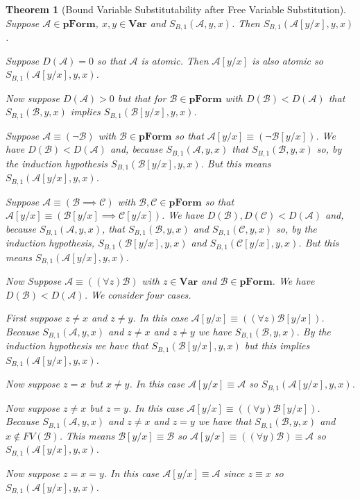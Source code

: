 \documentclass[12pt]{article}
\theoremstyle{break}
\theoremstyle{break}
\newtheorem{theorem}{Theorem}[section]
\theoremstyle{break}
\theoremstyle{break}
\theoremstyle{break}
\newtheorem{informal definition}[definition]{Informal Definition}
\newcommand{\mc}[1]{\mathcal{#1}}
\begin{document}
\begin{theorem}[Bound Variable Substitutability after Free Variable Substitution]
\label{thm:qvsubstitutabilityafterfvsub}
Suppose $\mc{A}\in\textbf{pForm}$, $x, y\in \textbf{Var}$ and $S_{B,1}(\mc{A}, y, x)$. Then $S_{B,1}(\mc{A}[y/x], y, x)$.

Suppose $D(\mc{A}) = 0$ so that $\mc{A}$ is atomic.
Then $\mc{A}[y/x]$ is also atomic so $S_{B,1}(\mc{A}[y/x], y, x)$.

Now suppose $D(\mc{A})>0$ but that for $\mc{B}\in\textbf{pForm}$ with $D(\mc{B}) < D(\mc{A})$ that $S_{B,1}(\mc{B}, y, x)$ implies $S_{B,1}(\mc{B}[y/x],y,x)$.

Suppose $\mc{A} \equiv (\lnot \mc{B})$ with $\mc{B}\in\textbf{pForm}$ so that $\mc{A}[y/x] \equiv (\lnot \mc{B}[y/x])$.
We have $D(\mc{B})<D(\mc{A})$ and, because $S_{B,1}(\mc{A}, y, x)$ that $S_{B,1}(\mc{B}, y, x)$ so, by the induction hypothesis $S_{B,1}(\mc{B}[y/x], y, x)$.
But this means $S_{B,1}(\mc{A}[y/x], y, x)$.

Suppose $\mc{A} \equiv (\mc{B}\implies\mc{C})$ with $\mc{B}, \mc{C}\in\textbf{pForm}$ so that $\mc{A}[y/x] \equiv (\mc{B}[y/x] \implies \mc{C}[y/x])$.
We have $D(\mc{B}), D(\mc{C}) < D(\mc{A})$ and, because $S_{B,1}(\mc{A}, y, x)$, that $S_{B,1}(\mc{B}, y, x)$ and $S_{B,1}(\mc{C}, y, x)$ so, by the induction hypothesis, $S_{B,1}(\mc{B}[y/x], y, x)$ and $S_{B,1}(\mc{C}[y/x], y, x)$.
But this means $S_{B,1}(\mc{A}[y/x], y, x)$.

Now Suppose $\mc{A} \equiv ((\forall z)\mc{B})$ with $z\in\textbf{Var}$ and $\mc{B}\in\textbf{pForm}$.
We have $D(\mc{B}) < D(\mc{A})$.
We consider four cases.

First suppose $z\not =x$ and $z \not = y$.
In this case $\mc{A}[y/x] \equiv ((\forall z)\mc{B}[y/x])$.
Because $S_{B,1}(\mc{A}, y, x)$ and $z\not =x$ and $z\not =y$ we have $S_{B,1}(\mc{B}, y, x)$.
By the induction hypothesis we have that $S_{B,1}(\mc{B}[y/x], y, x)$ but this implies $S_{B,1}(\mc{A}[y/x], y, x)$.

Now suppose $z=x$ but $x\not = y$.
In this case $\mc{A}[y/x] \equiv \mc{A}$ so $S_{B,1}(\mc{A}[y/x], y, x)$.

Now suppose $z\not = x$ but $z = y$.
In this case $\mc{A}[y/x] \equiv ((\forall y)\mc{B}[y/x])$.
Because $S_{B,1}(\mc{A}, y, x)$ and $z\not = x$ and $z=y$ we have that $S_{B,1}(\mc{B}, y, x)$ and $x\not \in FV(\mc{B})$.
This means $\mc{B}[y/x] \equiv \mc{B}$ so $\mc{A}[y/x] \equiv ((\forall y)\mc{B}) \equiv \mc{A}$ so $S_{B,1}(\mc{A}[y/x], y, x)$.

Now suppose $z=x=y$.
In this case $\mc{A}[y/x] \equiv \mc{A}$ since $z\equiv x$ so $S_{B,1}(\mc{A}[y/x], y, x)$.

\end{theorem}
\end{document}

